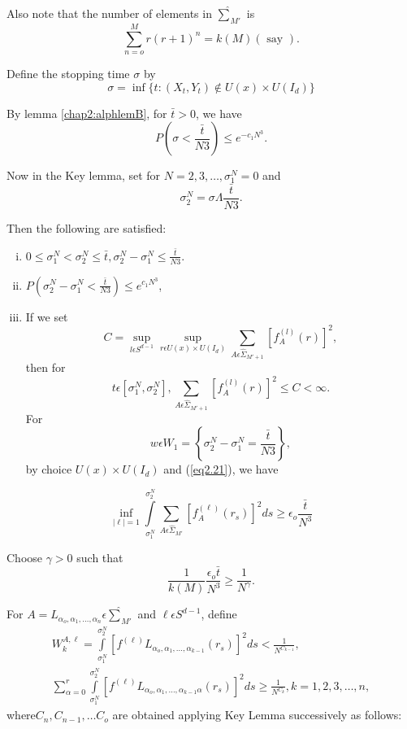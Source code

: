 Also note that the number of elements in $\hat{\sum}_{M'}$ is 
$$
\sum^{M}_{n=o} r(r+1)^n =k(M) (\text{ say }).
$$

Define the stopping time $\sigma$ by 
$$
\sigma = \inf \{ t: (X_t,Y_t) \notin U (x) \times U(I_d)\}
$$

By lemma \ref{chap2:alphlemB}, for $\bar{t}> 0$, we have 
$$
P\left( \sigma < \frac{\bar{t}}{N3}\right) \leq e^{-c_1 N^3}.
$$

Now in the Key lemma, set for $N= 2,3, \ldots, \sigma^N_1=0$ and 
$$
\sigma^N_2 = \sigma \Lambda \frac{\bar{t}}{N3}.
$$

Then the following are satisfied:
\begin{enumerate}[(i)]
\item \pageoriginale $0 \leq \sigma^N_1 < \sigma^N_2 \leq \bar{t}, \sigma^N_2 -
  \sigma^N_1 \leq \frac{\bar{t}}{N3}$. 
\item $P(\sigma^N_2- \sigma^N_1< \frac{\bar{t}}{N3} )\leq e^{c_1 N^3} $,
\item If we set 
  $$
  C = \sup_{l \epsilon  S^{d-1}} \sup_{r \epsilon  U(x) \times
    U(I_d)} \sum_{A \epsilon  \hat{\Sigma}_{M'+1}}\left[ f^{(l)}_A (r)\right]^2, 
  $$
  then for 
  $$
  t \epsilon  \left[\sigma^N_1, \sigma^N_2\right], \sum_{A \epsilon 
    \hat{\Sigma}_{M'+1}} \left[ f^{(l)}_A (r)\right]^2 \leq C < \infty. 
  $$
  For  
  $$
  w \epsilon  W_1 = \left\{\sigma^N_2 - \sigma^N_1 =
  \frac{\bar{t}}{N3} \right\}, 
  $$
  by choice $U(x) \times U(I_d)$ and (\ref{eq2.21}), we have 
\end{enumerate}

\begin{equation*}
  \inf_{|\ell|=1} \int\limits^{\sigma_2^N}_{\sigma^N_1} \sum_{A
    \epsilon  \hat{\Sigma}_{M'}} [ f^{(\ell)}_A (r_s)]^2 ds \geq
  \epsilon_o \frac{\bar{t}}{N^3} \tag{2.22}\label{eq2.22} 
\end{equation*}

Choose $\gamma > 0$ such that 
$$
\frac{1}{k(M)} \frac{\epsilon _o \bar{t}}{N^3} \geq \frac{1}{N^{\gamma}}.
$$

For $A = L_{\alpha_o, \alpha_1, \ldots, \alpha_n} \epsilon 
\hat{\sum}_{M'}$ and $\ell \epsilon  S^{d-1}$, define  
\begin{multline*}
  W^{A,\ell}_k  =
  \int\limits^{\sigma_2^N}_{\sigma^N_1}\left[f^{(\ell)}L_{\alpha_o, \alpha_1,
      \ldots, \alpha_{k-1}}(r_s)\right]^2 ds < \frac{1}{N^{C_{k-1}}},\\ 
  \sum^r_{\alpha =0}
  \int\limits^{\sigma_2^N}_{\sigma^N_1} \left[f^{(\ell)}L_{\alpha_o, \alpha_1, \ldots
     , \alpha_{k-1}\alpha}(r_s)\right]^2 ds \geq \frac{1}{N^{C_{k}}}, 
  k=1,2,3, \ldots, n, 
\end{multline*}
where\pageoriginale $C_n, C_{n-1}, \ldots C_o$ are obtained applying
Key Lemma successively as follows: 

